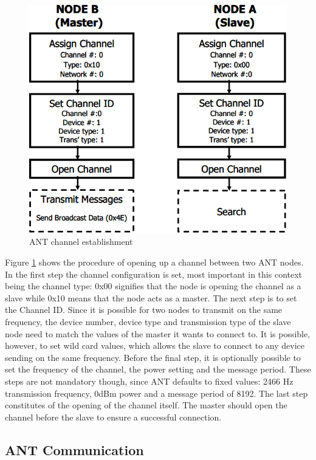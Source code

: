 \begin{figure}[H]
	\centering
	\includegraphics[scale=0.7]{content/images/ANTsetup.png}
	\caption{ANT channel establishment\cite{DynastreamInnovationsInc.2013}}\label{fig:antsetup}
\end{figure}

Figure \ref{fig:antsetup} shows the procedure of opening up a channel between two ANT nodes. In the first step the channel configuration is set, most important in this context being the channel type: 0x00 signifies that the node is opening the channel as a slave while 0x10 means that the node acts as a master. The next step is to set the Channel ID. Since it is possible for two nodes to transmit on the same frequency, the device number, device type and transmission type of the slave node need to match the values of the master it wants to connect to. It is possible, however, to set wild card values, which allows the slave to connect to any device sending on the same frequency. Before the final step, it is optionally possible to set the frequency of the channel, the power setting and the message period. These steps are not mandatory though, since ANT defaults to fixed values: 2466 Hz transmission frequency, 0dBm power and a message period of 8192. The last step constitutes of the opening of the channel itself. The master should open the channel before the slave to ensure a successful connection.

\subsection{ANT Communication}

